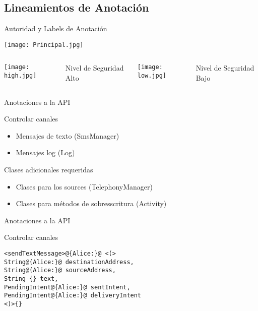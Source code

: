 \subsection{Lineamientos de Anotación} 
\begin{frame}{Autoridad y Labels de Anotación}
	\begin{center}
	\texttt{[image: Principal.jpg]}
	\end{center}
	\begin{columns}[c]
	\column{1.5in}
	\begin{center}
	\texttt{[image: high.jpg]}
	\end{center}
	Nivel de Seguridad Alto
	\column{1.5in}
	\begin{center} 
	\texttt{[image: low.jpg]}
	\end{center}
	Nivel de Seguridad Bajo\newline
	\end{columns}
\end{frame}	
\begin{frame}{Anotaciones a la API} %
	\begin{block}{Controlar canales} 
	\begin{itemize}
	  \item Mensajes de texto (SmsManager)
	  \item Mensajes log (Log)
	\end{itemize} 
	\end{block}
	\pause
	\begin{block}{Clases adicionales requeridas}
		\begin{itemize}
		  \item Clases para los sources (TelephonyManager)
		  \item Clases para métodos de sobresscritura (Activity)
		\end{itemize}
	\end{block}
\end{frame}	
\begin{frame}[fragile]{Anotaciones a la API}
\begin{block}{Controlar canales}
\begin{lstlisting}[style=base]
<sendTextMessage>@{Alice:}@ <(> 
String@{Alice:}@ destinationAddress, 
String@{Alice:}@ sourceAddress, 
String-{}-text, 
PendingIntent@{Alice:}@ sentIntent,
PendingIntent@{Alice:}@ deliveryIntent 
<)>{}
\end{lstlisting} 
\end{block}
\end{frame}

